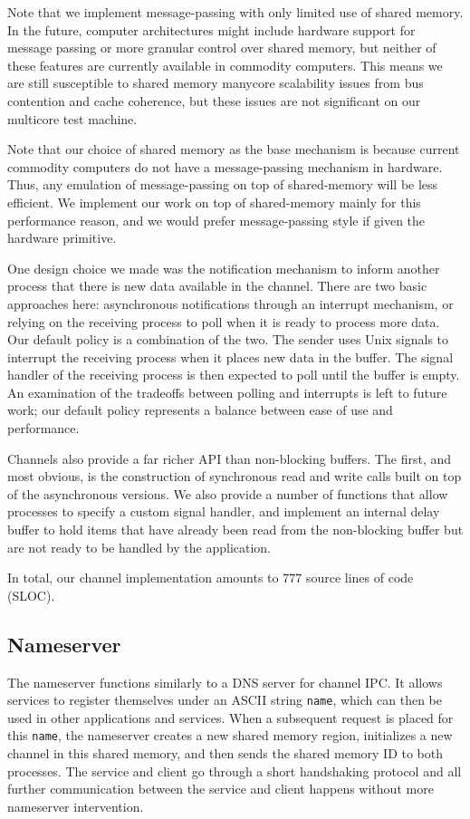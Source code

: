 \documentclass[letterpaper,twocolumn,11pt]{article}
\begin{document}
Note that we implement message-passing with only limited use of shared memory. In the future, computer architectures might include hardware support for message passing or more granular control over shared memory, but neither of these features are currently available in commodity computers. This means we are still susceptible to shared memory manycore scalability issues from bus contention and cache coherence, but these issues are not significant on our multicore test machine. 

Note that our choice of shared memory as the base mechanism is because current commodity computers do not have a message-passing mechanism in hardware. Thus, any emulation of message-passing on top of shared-memory will be less efficient. We implement our work on top of shared-memory mainly for this performance reason, and we would prefer message-passing style if given the hardware primitive.

One design choice we made was the notification mechanism to inform another process that there is new data available in the channel. There are two basic approaches here: asynchronous notifications through an interrupt mechanism, or relying on the receiving process to poll when it is ready to process more data. Our default policy is a combination of the two. The sender uses Unix signals to interrupt the receiving process when it places new data in the buffer. The signal handler of the receiving process is then expected to poll until the buffer is empty. An examination of the tradeoffs between polling and interrupts is left to future work; our default policy represents a balance between ease of use and performance.

Channels also provide a far richer API than non-blocking buffers. The first, and most obvious, is the construction of synchronous read and write calls built on top of the asynchronous versions. We also provide a number of functions that allow processes to specify a custom signal handler, and implement an internal delay buffer to hold items that have already been read from the non-blocking buffer but are not ready to be handled by the application.

In total, our channel implementation amounts to 777 source lines of code (SLOC).

\subsection{Nameserver}
The nameserver functions similarly to a DNS server for channel IPC. It allows services to register themselves under an ASCII string {\tt name}, which can then be used in other applications and services. When a subsequent request is placed for this {\tt name}, the nameserver creates a new shared memory region, initializes a new channel in this shared memory, and then sends the shared memory ID to both processes. The service and client go through a short handshaking protocol and all further communication between the service and client happens without more nameserver intervention.
\end{document}
